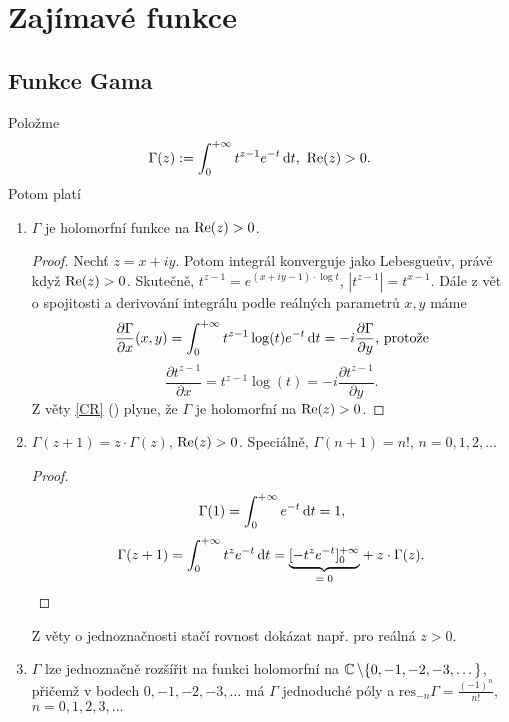 
\section{Zajímavé funkce}
\subsection{Funkce Gama}
Položme $$\Gamma (z) := \int_0^{+\infty}t^{z-1}e^{-t} \mathop{}\!\mathrm{d} t,\ \operatorname{Re}(z)>0.$$
Potom platí

\begin{enumerate}
    \item $\Gamma$ je holomorfní funkce na $\operatorname{Re}(z)>0$.
     \begin{proof}
      Nechť $z=x+iy$. Potom integrál konverguje jako Lebesgueův, právě když $\operatorname{Re}(z)>0$. Skutečně, $t^{z-1}=e^{(x+iy-1)\cdot \log t}$, $|t^{z-1}|=t^{x-1}$. Dále z vět o spojitosti a derivování integrálu podle reálných parametrů $x, y$ máme
      $$
       \frac{\partial \Gamma}{\partial x}(x,y)=\int_0^{+\infty}t^{z-1}\log (t) e^{-t} \mathop{}\!\mathrm{d} t=-i \frac{\partial \Gamma}{\partial y}\text{, protože}
      $$
      $$
       \frac{\partial t^{z-1}}{\partial x}=t^{z-1}\log (t)=-i \frac{\partial t^{z-1}}{\partial y}\text{.}
      $$
      Z věty \ref{CR} () plyne, že $\Gamma$ je holomorfní na $\operatorname{Re}(z)>0$.
     \end{proof}
    \item $\Gamma (z+1)=z \cdot \Gamma (z)$, $\operatorname{Re}(z)>0$. Speciálně, $\Gamma(n+1)=n!$, $n=0, 1, 2, \dots$
     \begin{proof}
      $$\Gamma (1)=\int_0^{+\infty}e^{-t} \mathop{}\!\mathrm{d} t=1,$$
      $$\Gamma(z+1)=\int_0^{+\infty}t^{z}e^{-t} \mathop{}\!\mathrm{d} t=\underset{=\;0}{\underbrace{[-t^ze^{-t}]_0^{+\infty}}}+z\cdot \Gamma (z).$$
     \end{proof}
     \begin{note*}
      Z věty o jednoznačnosti stačí rovnost dokázat např. pro reálná $z>0$.
     \end{note*}
    \item $\Gamma$ lze jednoznačně rozšířit na funkci holomorfní na $\operatorname{\mathbb{C}} \setminus \{0, -1, -2, -3, \dots \}$, přičemž v bodech $0, -1, -2, -3, \dots$ má $\Gamma$ jednoduché póly a $\text{res}_{-n} \Gamma=\frac{(-1)^n}{n!}$, $n=0, 1, 2, 3, \dots$
    

\end{enumerate}
